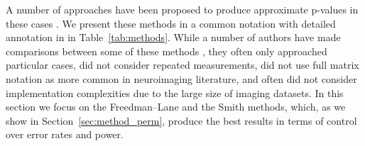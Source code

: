 A number of approaches have been proposed to produce approximate p-values in these cases \citep{Draper1966, Beaton1978, Still1981, Brown1982, Levin1983, Freedman1983, Oja1987, Gail1988, Welch1990, TerBraak1992, Kennedy1995, Edgington1995, Manly1997, Huh2001, Jung2006, Kherad2010}. We present these methods in a common notation with detailed annotation in in Table~\ref{tab:methods}.  While a number of authors have made comparisons between some of these methods \citep{Kennedy1995, Kennedy1996, Gonzalez1998, Anderson1999, Anderson2001, Anderson2003, OGorman2005, Dekker2007, Nichols2008, Ridgway2009}, they often only approached particular cases, did not consider repeated measurements, did not use full matrix notation as more common in neuroimaging literature, and often did not consider implementation complexities due to the large size of imaging datasets. In this section we focus on the Freedman--Lane and the Smith methods, which, as we show in Section~\ref{sec:method_perm}, produce the best results in terms of control over error rates and power.

